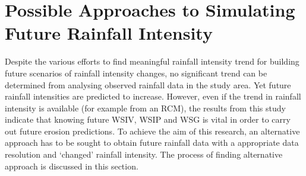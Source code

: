 

\section{Possible Approaches to Simulating Future Rainfall Intensity}
\label{sec:ProposedSimulationMethods}

Despite the various efforts to find meaningful rainfall intensity trend for
building future scenarios of rainfall intensity changes, no significant trend
can be determined from analysing observed rainfall data in the study area.
Yet future rainfall intensities are predicted to increase.
However, even if the trend in rainfall intensity is available (for
example from an RCM), the results from this study indicate that knowing future
WSIV, WSIP and WSG is vital in order to carry out future erosion predictions. To
achieve the aim of this research, an alternative approach has to be sought to
obtain future rainfall data with a appropriate data resolution and
`changed' rainfall
intensity. The process of finding alternative approach is discussed in this
section.




